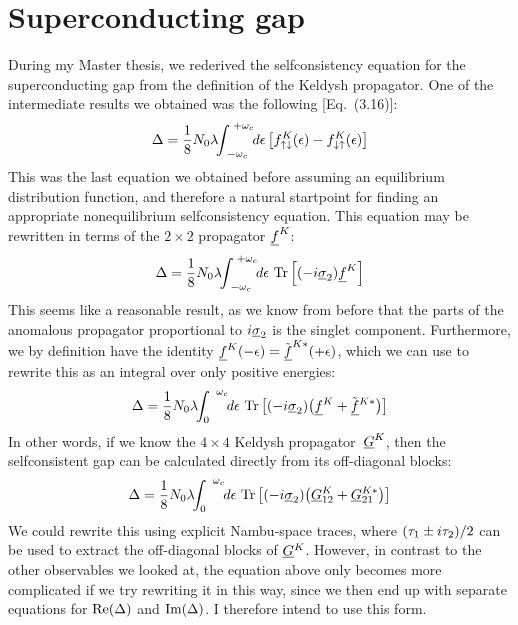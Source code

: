 \section{Superconducting gap}
During my Master thesis, we rederived the selfconsistency equation for the superconducting gap from the definition of the Keldysh propagator.
One of the intermediate results we obtained was the following [Eq.~(3.16)]:
\begin{equation}
  \Delta = \frac{1}{8} N_0\lambda \!\!\int_{\;-\omega_c}^{\;+\omega_c} \!\!\d\epsilon\, \big[ f^K_{\up\dn}(\epsilon) - f^K_{\dn\up}(\epsilon) \big]
\end{equation}
This was the last equation we obtained before assuming an equilibrium distribution function, and therefore a natural startpoint for finding an appropriate nonequilibrium selfconsistency equation.
This equation may be rewritten in terms of the $2\times2$ propagator $\U{f}^K$:
\begin{equation}
  \Delta = \frac{1}{8} N_0\lambda \!\!\int_{\;-\omega_c}^{\;+\omega_c} \!\!\d\epsilon\, \tr\left[ (-i\S{2})\U{f}^K \right]
\end{equation}
This seems like a reasonable result, as we know from before that the parts of the anomalous propagator proportional to $i\S{2}$ is the singlet component.
Furthermore, we by definition have the identity $\U{f}^K(-\epsilon) = \TU{f}^{K*}(+\epsilon)$, which we can use to rewrite this as an integral over only positive energies:
\begin{equation}
  \Delta = \frac{1}{8} N_0\lambda \!\!\int_{0}^{\;\;\omega_c} \!\!\d\epsilon\, \tr\left[ (-i\S{2})\big(\U{f}{}^K + \TU{f}{}^{K*}\big)\right]
\end{equation}
In other words, if we know the $4\times4$ Keldysh propagator~$\U{G}^K$, then the selfconsistent gap can be calculated directly from its off-diagonal blocks:
\begin{equation}
  \Delta = \frac{1}{8} N_0\lambda \!\!\int_{0}^{\;\;\omega_c} \!\!\d\epsilon\, \tr\left[ (-i\S{2})\big(\U{G}{}^K_{12} + \U{G}{}^{K*}_{21}\big)\right]
\end{equation}
We could rewrite this using explicit Nambu-space traces, where $(\N{1} \pm i\N{2})/2$ can be used to extract the off-diagonal blocks of $\U{G}{}^K$.
However, in contrast to the other observables we looked at, the equation above only becomes more complicated if we try rewriting it in this way, since we then end up with separate equations for $\re(\Delta)$ and $\im(\Delta)$.
I therefore intend to use this form.



